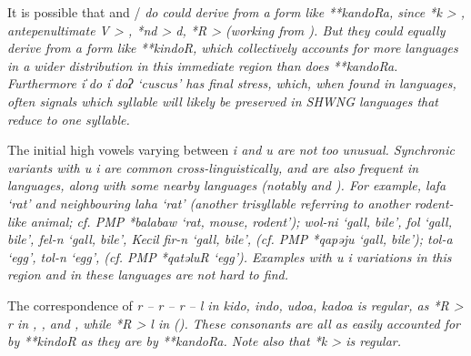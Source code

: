 It is possible that 
and / \it{do} could derive from a form like \mbox{**kandoRa},
since *k > {\0},
antepenultimate V > {\0},
*nd > \it{d}, *R > {\0} (working from \citealp{Kamholz2014}).
But they could equally derive from a form like **kindoR,
which collectively accounts for more languages in a wider distribution
in this immediate region than does **kandoRa.
Furthermore  \it{iˈdo {\tl} iˈdoʔ} ‘cuscus’ has
final stress, which, when found in  languages,
often signals which syllable will likely be preserved in SHWNG
languages that reduce to one syllable.

The initial high vowels varying between \it{i}
and \it{u} are not too unusual.
Synchronic variants with \it{u {\tl} i} are common cross-linguistically,
and are also frequent in  languages,
along with some nearby  languages (notably  and ).
For example,  \it{lafa} ‘rat’
and neighbouring  \it{laha} ‘rat’ (another trisyllable
referring to another rodent-like animal; cf.
PMP *balabaw ‘rat, mouse,
rodent’);  \it{wol-ni} ‘gall,
bile’,  \it{fol} ‘gall, bile’,
 \it{fel-n} ‘gall, bile’,
 Kecil \it{fir-n} ‘gall, bile’, (cf.
PMP *qapəju ‘gall, bile’);  \it{tol-a} ‘egg’,
 \it{tol-n} ‘egg’, (cf. PMP *qatəluR ‘egg’).
Examples with \it{u {\tl} i} variations in this region
and in these languages are not hard to find.

The correspondence of \it{r -- r -- r -- l} in  \it{kido},
 \it{indo},  \it{udoa},
 \it{kadoa} is regular,
as *R > \it{r} in ,
, and , while *R > \it{l} in  ().
These consonants are all as easily accounted for by **kindoR
as they are by **kandoRa.
Note also that  *k > {\0} is regular.

